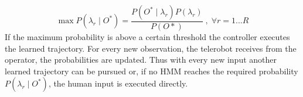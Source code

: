 \documentclass[a4paper,twoside, openright,12pt]{report}
\begin{document}
\begin{equation}
\max P(\lambda_r \mid O^*) = \frac{P(O^* \mid \lambda_r) P(\lambda_r)}{P(O*)} \; , \; \forall r=1...R
\end{equation}
If the maximum probability is above a certain threshold the controller executes the learned trajectory. For every new observation, the telerobot receives from the operator, the probabilities are updated. Thus with every new input another learned trajectory can be pursued or, if no HMM reaches the required probability $P(\lambda_r \mid O^*)$, the human input is executed directly.
%
\end{document}
